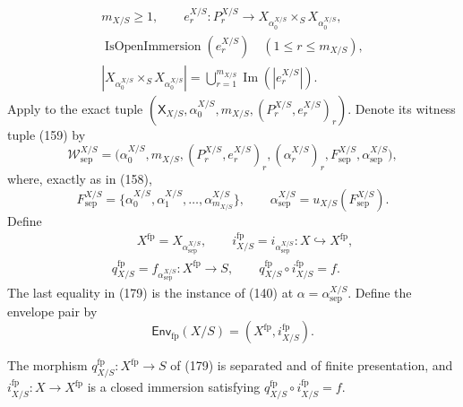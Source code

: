 \begin{definition}
\[\begin{gathered}
    m_{X/S}\geq1,\qquad
    e^{X/S}_r\colon P^{X/S}_r\to
      X_{\alpha^{X/S}_0}\times_SX_{\alpha^{X/S}_0},\\
    \operatorname{IsOpenImmersion}(e^{X/S}_r)
      \quad(1\leq r\leq m_{X/S}),\\
    |X_{\alpha^{X/S}_0}\times_SX_{\alpha^{X/S}_0}|
      =\bigcup_{r=1}^{m_{X/S}}\operatorname{Im}(|e^{X/S}_r|).
  \end{gathered}                                                     \tag{176}
  \]
  Apply  to the exact tuple
  $(\mathsf X_{X/S},\alpha^{X/S}_0,m_{X/S},
    (P^{X/S}_r,e^{X/S}_r)_r)$.  Denote its witness tuple (159) by
  \[
    \mathcal W^{X/S}_{\mathrm{sep}}
      =\bigl(\alpha^{X/S}_0,m_{X/S},
        (P^{X/S}_r,e^{X/S}_r)_r,
        (\alpha^{X/S}_r)_r,F^{X/S}_{\mathrm{sep}},
        \alpha^{X/S}_{\mathrm{sep}}\bigr),                       \tag{177}
  \]
  where, exactly as in (158),
  \[
    F^{X/S}_{\mathrm{sep}}
      =\{\alpha^{X/S}_0,\alpha^{X/S}_1,\ldots,
          \alpha^{X/S}_{m_{X/S}}\},
    \qquad
    \alpha^{X/S}_{\mathrm{sep}}
      =u_{X/S}(F^{X/S}_{\mathrm{sep}}).                          \tag{178}
  \]
  Define
  \[
  \begin{gathered}
    \qquad
    X^{\mathrm{fp}}=X_{\alpha^{X/S}_{\mathrm{sep}}},
    \qquad
    i^{\mathrm{fp}}_{X/S}
      =i_{\alpha^{X/S}_{\mathrm{sep}}}\colon X\hookrightarrow X^{\mathrm{fp}},
    \\
    q^{\mathrm{fp}}_{X/S}
      =f_{\alpha^{X/S}_{\mathrm{sep}}}\colon X^{\mathrm{fp}}\to S,
    \qquad
    q^{\mathrm{fp}}_{X/S}\circ i^{\mathrm{fp}}_{X/S}=f.
  \end{gathered}                                                 \tag{179}
  \]
  The last equality in (179) is the instance of (140) at
  $\alpha=\alpha^{X/S}_{\mathrm{sep}}$.  Define the envelope pair by
  \[
    \mathsf{Env}_{\mathrm{fp}}(X/S)
      =(X^{\mathrm{fp}},i^{\mathrm{fp}}_{X/S}).                  \tag{180}
  \]
\end{definition}

\begin{proposition}
  \label{prop:nagata-finite-type-closed-in-fp}

  The morphism
  $q^{\mathrm{fp}}_{X/S}\colon X^{\mathrm{fp}}\to S$ of (179) is separated
  and of finite presentation, and
  $i^{\mathrm{fp}}_{X/S}\colon X\to X^{\mathrm{fp}}$ is a closed immersion
  satisfying $q^{\mathrm{fp}}_{X/S}\circ i^{\mathrm{fp}}_{X/S}=f$.
\end{proposition}

